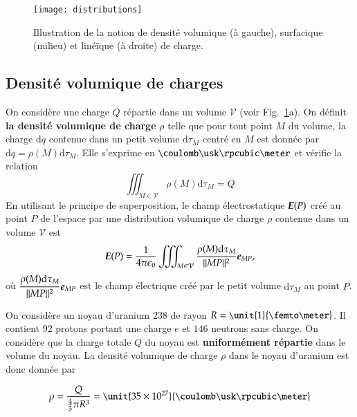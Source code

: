 \begin{figure}
	\centering
	\texttt{[image: distributions]}
	\caption{Illustration de la notion de densité volumique (à gauche),
		 surfacique (milieu) et linéïque (à droite) de charge.}%
	\label{fig:distributions}
\end{figure}

\subsection{Densité volumique de charges}
	On considère une charge $Q$ répartie dans un volume $\mathcal{V}$
	(voir Fig.~\ref{fig:distributions}a). 
	On définit \textbf{
	la densité volumique de charge} $\rho$ 
	telle que pour tout point $M$ du volume,
	la charge $\mathrm{d}q$ contenue dans un petit volume $\mathrm{d}\tau_M$ centré 
	en $M$ est donnée par $\mathrm{d}q = \rho(M) \mathrm{d}\tau_M$.
	Elle s'exprime en $\coulomb \usk \rpcubic \meter$ et vérifie la relation
\begin{equation*}
	\iiint_{M \in \mathcal{V}} \rho(M) \mathrm{d}\tau_M = Q
\end{equation*}
En utilisant le principe de superposition, le champ électrostatique $\vece(P)$
créé au point $P$ de l'espace par une distribution volumique de charge $\rho$
contenue dans un volume $\mathcal{V}$ est
\begin{equation}
	\vece(P) = \pieps \iiint_{M \in \mathcal{V}} 
	\dfrac{\rho(M) \mathrm{d}\tau_M}{||MP||^2}\mitbf{e}_{MP},
\end{equation}
où $\dfrac{\rho(M) \mathrm{d}\tau_M}{||MP||^2}\mitbf{e}_{MP}$ est le champ 
électrique créé par le petit volume $\mathrm{d}\tau_M$ au point $P$.

\begin{exemple}
	On considère un noyau d'uranium $238$ de rayon $R = \unit{1}{\femto \meter}$.
	Il contient $92$ protons portant une charge $e$ et $146$ neutrons sans charge.
	On considère que la charge totale $Q$ du noyau est \textbf{uniformément répartie}
	dans le volume du noyau. La densité volumique de charge $\rho$ dans 
	le noyau d'uranium est donc donnée par

	\begin{equation*}
		\rho = \dfrac{Q}{\frac{4}{3}\pi R^3} = 
		\unit{35 \times 10^{27}}{\coulomb \usk \rpcubic \meter}
	\end{equation*}
\end{exemple}

